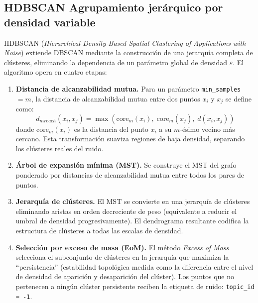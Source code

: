 \subsection{HDBSCAN Agrupamiento jerárquico por densidad variable}
\label{subsec:mt_hdbscan}


HDBSCAN (\textit{Hierarchical Density-Based Spatial Clustering of Applications
with Noise}) \cite{campello2013hdbscan} extiende DBSCAN mediante la construcción
de una jerarquía completa de clústeres, eliminando la dependencia de un parámetro
global de densidad $\varepsilon$. El algoritmo opera en cuatro etapas:

\begin{enumerate}
    \item \textbf{Distancia de alcanzabilidad mutua.} Para un parámetro
          \texttt{min\_samples} $= m$, la distancia de alcanzabilidad mutua entre
          dos puntos $x_i$ y $x_j$ se define como:
          \begin{equation}
              d_{mreach}(x_i, x_j) = \max\!\left(\text{core}_m(x_i),\; \text{core}_m(x_j),\; d(x_i, x_j)\right)
          \end{equation}
          donde $\text{core}_m(x_i)$ es la distancia del punto $x_i$ a su $m$-ésimo
          vecino más cercano. Esta transformación suaviza regiones de baja densidad,
          separando los clústeres reales del ruido.

    \item \textbf{Árbol de expansión mínima (MST).} Se construye el MST del grafo
          ponderado por distancias de alcanzabilidad mutua entre todos los pares
          de puntos.

    \item \textbf{Jerarquía de clústeres.} El MST se convierte en una jerarquía
          de clústeres eliminando aristas en orden decreciente de peso (equivalente
          a reducir el umbral de densidad progresivamente). El dendrograma resultante
          codifica la estructura de clústeres a todas las escalas de densidad.

    \item \textbf{Selección por exceso de masa (EoM).} El método \textit{Excess
          of Mass} selecciona el subconjunto de clústeres en la jerarquía que
          maximiza la ``persistencia'' (estabilidad topológica medida como la
          diferencia entre el nivel de densidad de aparición y desaparición del
          clúster). Los puntos que no pertenecen a ningún clúster persistente
          reciben la etiqueta de ruido: \texttt{topic\_id = -1}.
\end{enumerate}

